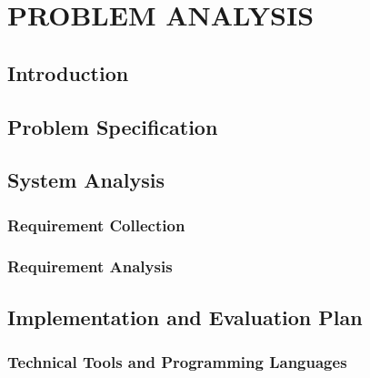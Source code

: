 \chapter{PROBLEM ANALYSIS}
\pagebreak

\section{Introduction}
\label{sec:pa-intro}


\section{Problem Specification}
\label{sec:problem-spec}


\section{System Analysis}
\label{sec:system-analysis}

\subsection{Requirement Collection}
\label{sec:req-collection}


\subsection{Requirement Analysis}
\label{sec:req-analysis}


\section{Implementation and Evaluation Plan}
\label{sec:impl-eval-plan}


\subsection{Technical Tools and Programming Languages}
\label{sec:tools}

